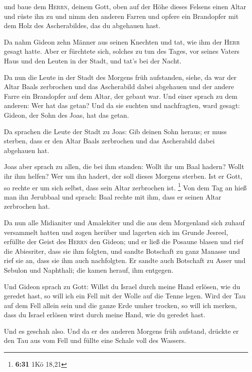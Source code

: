  und baue dem \textsc{Herrn}, deinem Gott, oben auf der
Höhe dieses Felsens einen Altar und rüste ihn zu und nimm den anderen
Farren und opfere ein Brandopfer mit dem Holz des Ascherabildes, das du
abgehauen hast.

 Da nahm Gideon zehn Männer aus seinen Knechten und tat,
wie ihm der \textsc{Herr} gesagt hatte. Aber er fürchtete sich, solches
zu tun des Tages, vor seines Vaters Haus und den Leuten in der Stadt,
und tat's bei der Nacht.

 Da nun die Leute in der Stadt des Morgens früh
aufstanden, siehe, da war der Altar Baals zerbrochen und das Ascherabild
dabei abgehauen und der andere Farre ein Brandopfer auf dem Altar, der
gebaut war.  Und einer sprach zu dem anderen: Wer hat das
getan? Und da sie suchten und nachfragten, ward gesagt: Gideon, der Sohn
des Joas, hat das getan.

 Da sprachen die Leute der Stadt zu Joas: Gib deinen Sohn
heraus; er muss sterben, dass er den Altar Baals zerbrochen und das
Ascherabild dabei abgehauen hat.

 Joas aber sprach zu allen, die bei ihm standen: Wollt
ihr um Baal hadern? Wollt ihr ihm helfen? Wer um ihn hadert, der soll
dieses Morgens sterben. Ist er Gott, so rechte er um sich selbst, dass
sein Altar zerbrochen ist. \footnote{\textbf{6:31} 1Kö 18,21}
 Von dem Tag an hieß man ihn Jerubbaal und sprach: Baal
rechte mit ihm, dass er seinen Altar zerbrochen hat.

 Da nun alle Midianiter und Amalekiter und die aus dem
Morgenland sich zuhauf versammelt hatten und zogen herüber und lagerten
sich im Grunde Jesreel,  erfüllte der Geist des
\textsc{Herrn} den Gideon; und er ließ die Posaune blasen und rief die
Abiesriter, dass sie ihm folgten,  und sandte Botschaft
zu ganz Manasse und rief sie an, dass sie ihm auch nachfolgten. Er
sandte auch Botschaft zu Asser und Sebulon und Naphthali; die kamen
herauf, ihm entgegen.

 Und Gideon sprach zu Gott: Willst du Israel durch meine
Hand erlösen, wie du geredet hast,  so will ich ein Fell
mit der Wolle auf die Tenne legen. Wird der Tau auf dem Fell allein sein
und die ganze Erde umher trocken, so will ich merken, dass du Israel
erlösen wirst durch meine Hand, wie du geredet hast.

 Und es geschah also. Und da er des anderen Morgens früh
aufstand, drückte er den Tau aus vom Fell und füllte eine Schale voll
des Wassers.


